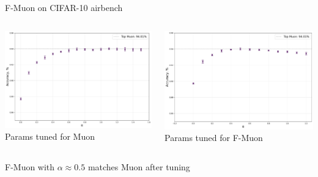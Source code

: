 \documentclass[aspectratio=169]{beamer}
\begin{document}
\begin{frame}{F-Muon on CIFAR-10 airbench}
    \begin{columns}[T,totalwidth=\textwidth]
      \begin{column}{0.48\textwidth}
        \includegraphics[width=\linewidth]{muon_tuned_diff_alpha.pdf}
        \centering
        \scriptsize Params tuned for Muon \citep{cifar2023airbench}
      \end{column}
      \begin{column}{0.48\textwidth}
        \includegraphics[width=\linewidth]{fmuon_tuned_diff_alpha.pdf}
        \centering
        \scriptsize Params tuned for F-Muon
      \end{column}
    \end{columns}
    \vspace{0.6em}
    \centering

    \footnotesize F-Muon with \(\alpha\approx 0.5\) matches Muon after tuning
  \end{frame}
\end{document}
